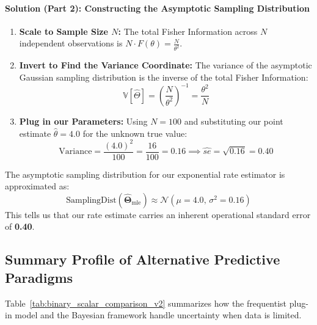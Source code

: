 \documentclass{article}
\begin{document}
\paragraph{Solution (Part 2): Constructing the Asymptotic Sampling Distribution}
\begin{enumerate}
    \item \textbf{Scale to Sample Size $N$:}
    The total Fisher Information across $N$ independent observations is $N \cdot F(\theta) = \frac{N}{\theta^2}$.
    
    \item \textbf{Invert to Find the Variance Coordinate:}
    The variance of the asymptotic Gaussian sampling distribution is the inverse of the total Fisher Information:
    \begin{equation}
    \mathbb{V}[\hat{\Theta}] = \left(\frac{N}{\theta^2}\right)^{-1} = \frac{\theta^2}{N}
    \end{equation}
    
    \item \textbf{Plug in our Parameters:}
    Using $N = 100$ and substituting our point estimate $\hat{\theta} = 4.0$ for the unknown true value:
    \begin{equation}
    \text{Variance} = \frac{(4.0)^2}{100} = \frac{16}{100} = 0.16 \implies \hat{se} = \sqrt{0.16} = 0.40
    \end{equation}
\end{enumerate}
The asymptotic sampling distribution for our exponential rate estimator is approximated as:
\begin{equation}
\text{SamplingDist}(\hat{\boldsymbol{\Theta}}_{\text{mle}}) \approx \mathcal{N}(\mu = 4.0, \, \sigma^2 = 0.16)
\end{equation}
This tells us that our rate estimate carries an inherent operational standard error of \textbf{0.40}.

\subsection{Summary Profile of Alternative Predictive Paradigms}
Table~\ref{tab:binary_scalar_comparison_v2} summarizes how the frequentist plug-in model and the Bayesian framework handle uncertainty when data is limited.
\end{document}

